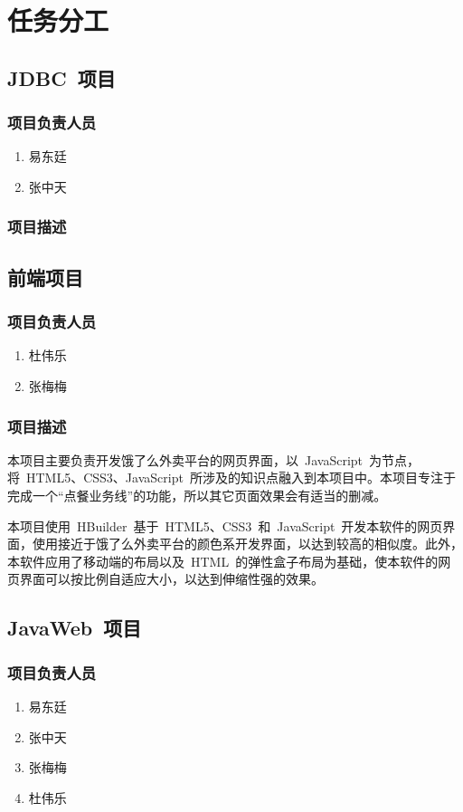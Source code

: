 \chapter{任务分工}
\section{JDBC~项目}
\subsection{项目负责人员}
\begin{enumerate}
    \item{易东廷}
    \item{张中天}
\end{enumerate}
\subsection{项目描述}

\section{前端项目}
\subsection{项目负责人员}
\begin{enumerate}
    \item{杜伟乐}
    \item{张梅梅}
\end{enumerate}
\subsection{项目描述}
本项目主要负责开发饿了么外卖平台的网页界面，以~JavaScript~为节点，将~HTML5、CSS3、JavaScript~所涉及的知识点融入到本项目中。本项目专注于完成一个“点餐业务线”的功能，所以其它页面效果会有适当的删减。

本项目使用~HBuilder~基于~HTML5、CSS3~和~JavaScript~开发本软件的网页界面，使用接近于饿了么外卖平台的颜色系开发界面，以达到较高的相似度。此外，本软件应用了移动端的布局以及~HTML~的弹性盒子布局为基础，使本软件的网页界面可以按比例自适应大小，以达到伸缩性强的效果。

\section{JavaWeb~项目}
\subsection{项目负责人员}
\begin{enumerate}
    \item{易东廷}
    \item{张中天}
    \item{张梅梅}
    \item{杜伟乐}
\end{enumerate}
